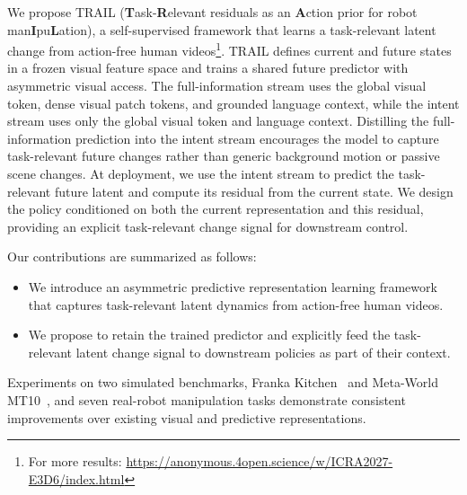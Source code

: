 We propose TRAIL (\textbf{T}ask-\textbf{R}elevant residuals as an \textbf{A}ction prior for robot man\textbf{I}pu\textbf{L}ation), a self-supervised framework that learns a task-relevant latent change from action-free human videos\footnote{For more results: \url{https://anonymous.4open.science/w/ICRA2027-E3D6/index.html}}. TRAIL defines current and future states in a frozen visual feature space and trains a shared future predictor with asymmetric visual access. The full-information stream uses the global visual token,
dense visual patch tokens, and grounded language context, while the intent stream uses only the global visual token and language context. 
Distilling the full-information prediction into the intent stream encourages the model to capture task-relevant future changes rather than generic background motion or passive scene changes. At deployment, we use the intent stream to predict the task-relevant future latent and compute its residual from the current state. We design the policy conditioned on both the current representation and this residual, providing an explicit task-relevant change signal for downstream control.

Our contributions are summarized as follows:

\begin{itemize}
    \item We introduce an asymmetric predictive representation learning framework that captures task-relevant latent dynamics from action-free human videos.
    \item We propose to retain the trained predictor and explicitly feed the task-relevant latent change signal to downstream policies as part of their context.
\end{itemize}

Experiments on two simulated benchmarks, Franka Kitchen~\cite{franka_kitchen} and Meta-World MT10~\cite{yu2020meta}, and seven real-robot manipulation tasks demonstrate consistent improvements over existing visual and predictive representations.